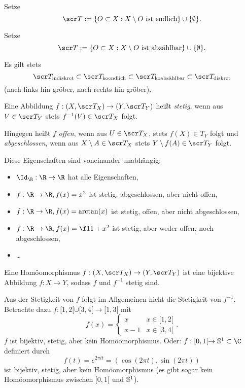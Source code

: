 \begin{ex}
	Setze
	\[
		\scr T
		:= \{ O \subset X : X \setminus O \text{ ist endlich} \} \cup \{\emptyset\}.
	\]
\end{ex}

\begin{ex}
	Setze
	\[
		\scr T
		:= \{ O \subset X : X \setminus O \text{ ist abzählbar} \} \cup \{ \emptyset \}.
	\]
\end{ex}

\begin{nt}
	Es gilt stets
	\[
		\scr T_{\text{indiskret}}
		\subset \scr T_{\text{koendlich}}
		\subset \scr T_{\text{koabzählbar}}
		\subset \scr T_{\text{diskret}}
	\]
	(nach links hin gröber, nach rechts hin gröber).
\end{nt}

\begin{df}
	Eine Abbildung $f: (X,\scr T_X) \to (Y, \scr T_Y)$ heißt \emph{stetig}, wenn aus $V \in \scr T_Y$ stets $f^{-1}(V) \in \scr T_X$ folgt.

	Hingegen heißt $f$ \emph{offen}, wenn aus $U \in \scr T_X$, stets $f(X) \in T_Y$ folgt und \emph{abgeschlossen}, wenn aus $X \setminus A \in \scr T_X$ stets $Y \setminus f(A) \in \scr T_Y$ folgt.
	\begin{nt*}
		Diese Eigenschaften sind voneinander unabhängig:
		\begin{itemize}
			\item
				$\Id_\R: \R \to \R$ hat alle Eigenschaften,
			\item
				$f: \R \to \R, f(x) = x^2$ ist stetig, abgeschlossen, aber nicht offen,
			\item
				$f: \R \to \R, f(x) = \arctan(x)$ ist stetig, offen, aber nicht abgeschlossen,
			\item
				$f: \R \to \R, f(x) = \f 1{1+x^2}$ ist stetig, aber weder offen, noch abgeschlossen,
			\item
				\dots
		\end{itemize}
	\end{nt*}
\end{df}

\begin{df}
	Eine Homöomorphismus $f: (X,\scr T_X) \to (Y, \scr T_Y)$ ist eine bijektive Abbildung $f: X \to Y$, sodass $f$ und $f^{-1}$ stetig sind.
\end{df}

\begin{nt}
	Aus der Stetigkeit von $f$ folgt im Allgemeinen nicht die Stetigkeit von $f^{-1}$.
	Betrachte dazu $f: [1,2[ \cup [3,4[ \to [1,3[$ mit
	\[
		f(x) = \begin{cases}
			x & x \in [1,2[ \\
			x - 1 & x \in [3,4[
		\end{cases}.
	\]
	$f$ ist bijektiv, stetig, aber kein Homöomorphismus.
	Oder: $f : [0,1[ \to \S^1 \subset \C$ definiert durch
	\[
		f(t)
		= e^{2\pi i t}
		= (\cos (2\pi t), \sin (2\pi t))
	\]
	ist bijektiv, stetig, aber kein Homöomorphismus (es gibt sogar kein Homöomorphismus zwischen $[0,1[$ und $\S^1$).
\end{nt}


